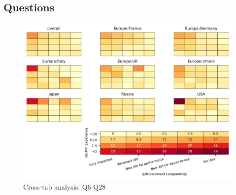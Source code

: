 
\subsection{Questions}


\begin{figure}
\begin{center}
\includegraphics[width=12cm]{../pdfs/Q6-Q28.pdf}
\caption{Cross-tab analysis: Q6-Q28}
\label{fig:Q6-Q28}
\end{center}
\end{figure}
